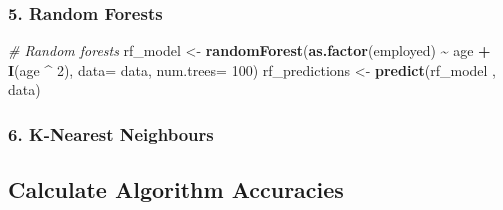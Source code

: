 \documentclass[
]{article}
\newenvironment{Shaded}{\begin{snugshade}}{\end{snugshade}}
\newcommand{\AttributeTok}[1]{\textcolor[rgb]{0.13,0.29,0.53}{#1}}
\newcommand{\CommentTok}[1]{\textcolor[rgb]{0.56,0.35,0.01}{\textit{#1}}}
\newcommand{\DecValTok}[1]{\textcolor[rgb]{0.00,0.00,0.81}{#1}}
\newcommand{\FunctionTok}[1]{\textcolor[rgb]{0.13,0.29,0.53}{\textbf{#1}}}
\newcommand{\NormalTok}[1]{#1}
\newcommand{\OtherTok}[1]{\textcolor[rgb]{0.56,0.35,0.01}{#1}}
\newcommand{\SpecialCharTok}[1]{\textcolor[rgb]{0.81,0.36,0.00}{\textbf{#1}}}
\newcommand{\StringTok}[1]{\textcolor[rgb]{0.31,0.60,0.02}{#1}}
\begin{document}
\hypertarget{random-forests}{%
\subsubsection{5. Random Forests}\label{random-forests}}

\begin{Shaded}
\begin{Highlighting}[]
\CommentTok{\# Random forests}
\NormalTok{rf\_model }\OtherTok{\textless{}{-}} \FunctionTok{randomForest}\NormalTok{(}\FunctionTok{as.factor}\NormalTok{(employed) }\SpecialCharTok{\textasciitilde{}}\NormalTok{ age }\SpecialCharTok{+}  \FunctionTok{I}\NormalTok{(age }\SpecialCharTok{\^{}} \DecValTok{2}\NormalTok{),}
                         \AttributeTok{data=}\NormalTok{ data, }
                         \AttributeTok{num.trees=} \DecValTok{100}\NormalTok{) }
\NormalTok{rf\_predictions }\OtherTok{\textless{}{-}} \FunctionTok{predict}\NormalTok{(rf\_model , data)}
\end{Highlighting}
\end{Shaded}

\hypertarget{k-nearest-neighbours}{%
\subsubsection{6. K-Nearest Neighbours}\label{k-nearest-neighbours}}

\begin{Shaded}
\end{Shaded}

\hypertarget{calculate-algorithm-accuracies}{%
\subsection{Calculate Algorithm
Accuracies}\label{calculate-algorithm-accuracies}}
\end{document}
